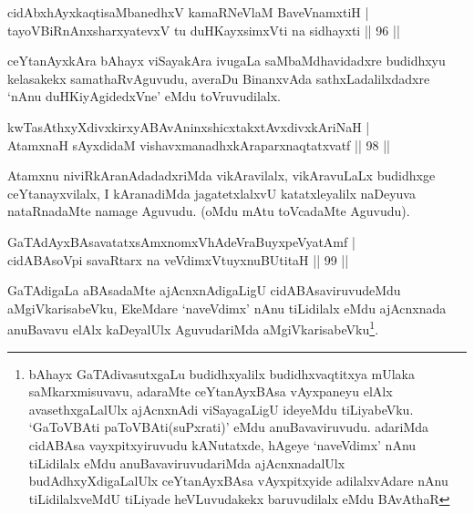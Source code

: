 
\begin{shl}
cidAbxhAyxkaqtisaMbanedhxV kamaRNeV\s laM BaveVnamxtiH | \\
tayoVBiRnAnxsharxyatevxV tu duHKayxsimxVti na sidhayxti \hfill ||  96 ||  
\end{shl}

\begin{artha}
ceYtanAyxkAra bAhayx viSayakAra ivugaLa saMbaMdhavidadxre budidhxyu kelasakekx samathaRvAguvudu, averaDu BinanxvAda sathxLadalilxdadxre `nAnu duHKiyAgidedxVne' eMdu toVruvudilalx.
\end{artha}


\begin{shl}
kwTasAthxyXdivxkirxyABAvAninxshicxtakxtAvxdivxkAriNaH | \\
AtamxnaH sAyxdidaM vishavxmanadhxkAraparxnaqtatxvatf \hfill||  98 ||  
\end{shl}

\begin{artha}
Atamxnu niviRkAranAdadadxriMda vikAravilalx, vikAravuLaLx budidhxge ceYtanayxvilalx, I kAranadiMda jagatetxlalxvU katatxleyalilx naDeyuva nataRnadaMte namage Aguvudu. (oMdu mAtu toVcadaMte Aguvudu).
\end{artha}


\begin{shl}
GaTAdAyxBAsavatatxsAmxnomxVhAdeVraBuyxpeVyatAmf | \\
cidABAsoV\s pi savaRtarx na veVdimxVtuyxnuBUtitaH \hfill||  99 ||  
\end{shl}

\begin{artha}
GaTAdigaLa aBAsadaMte ajAcnxnAdigaLigU cidABAsaviruvudeMdu aMgiVkarisabeVku, EkeMdare `naveVdimx' nAnu tiLidilalx eMdu ajAcnxnada anuBavavu elAlx kaDeyalUlx AguvudariMda aMgiVkarisabeVku\footnote{bAhayx GaTAdivasutxgaLu budidhxyalilx budidhxvaqtitxya mUlaka saMkarxmisuvavu, adaraMte ceYtanAyxBAsa vAyxpaneyu elAlx avasethxgaLalUlx ajAcnxnAdi viSayagaLigU ideyeMdu tiLiyabeVku. `GaToVBAti paToVBAti(suPxrati)' eMdu anuBavaviruvudu. adariMda cidABAsa vayxpitxyiruvudu kANutatxde, hAgeye `naveVdimx' nAnu tiLidilalx eMdu anuBavaviruvudariMda ajAcnxnadalUlx budAdhxyXdigaLalUlx ceYtanAyxBAsa vAyxpitxyide adilalxvAdare nAnu tiLidilalxveMdU tiLiyade heVLuvudakekx baruvudilalx eMdu BAvAthaR}.
\end{artha}

